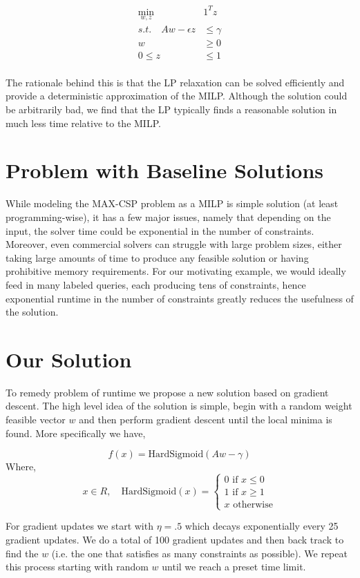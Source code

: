 \documentclass[a4paper]{article}
\begin{document}
\begin{align*}
\min_{w,z}\quad &1^Tz\\
s.t. \quad Aw - \epsilon z &\leq \gamma\\
		w &\geq 0\\
		0 \leq z &\leq 1\\
\end{align*}

The rationale behind this is that the LP relaxation can be solved efficiently and provide a 
deterministic approximation of the MILP. Although the solution could be arbitrarily bad,
we find that the LP typically finds a reasonable solution in much less time 
relative to the MILP. 

\section{Problem with Baseline Solutions}

While modeling the MAX-CSP problem as a MILP is simple solution (at least programming-wise), 
it has a few major issues, namely that depending on the input, the solver time could be exponential in 
the number of constraints. Moreover, even commercial solvers can struggle with large problem sizes, 
either taking large amounts of time to produce any feasible solution or having prohibitive memory requirements.
For our motivating example, we would ideally feed in many labeled queries, 
each producing tens of constraints, hence exponential runtime in the number of constraints greatly 
reduces the usefulness of the solution. 


\section{Our Solution}

To remedy problem of runtime we propose a new solution based on gradient descent. The high level
idea of the solution is simple, begin with a random weight feasible vector $w$ and then perform 
gradient descent until the local minima is found. More specifically we have, 

$$
f(x) = \text{HardSigmoid}(Aw - \gamma)
$$
Where, 
$$
x\in R, \quad \text{HardSigmoid}(x) = \begin{cases} 0 \text{ if } x \leq 0\\ 1 \text{ if } x \geq 1\\ x \text{ otherwise}\end{cases}
$$

For gradient updates we start with $\eta = .5$ which decays exponentially every 25 gradient updates. We do a total 
of 100 gradient updates and then back track to find the $w$ (i.e. the one that satisfies as many constraints as 
possible). We repeat this process starting with random $w$ until we reach a preset time limit.
\end{document}
